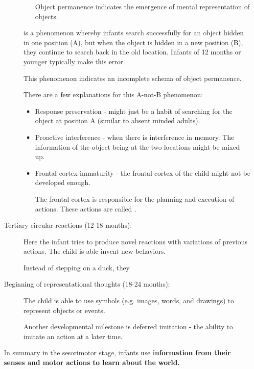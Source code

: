 \documentclass[../main/main.tex]{subfiles}
\begin{document}
\begin{description}
\begin{itemize}
                Object permanence indicates the emergence of mental representation of objects.
        \end{itemize}
 is a phenomenon whereby infants search successfully for an object hidden in one position (A), but when the object is hidden in a new position (B), they continue to search back in the old location. Infants of 12 months or younger typically make this error.
            \begin{remark} This phenomenon indicates an incomplete schema of object permanence.
                \end{remark}
                There are a few explanations for this A-not-B phenomenon:
                \begin{itemize}
                  \item Response preservation - might just be a habit of searching for the object at position A (similar to absent minded adults).
                  \item Proactive interference - when there is interference in memory. The information of the object being at the two locations might be mixed up.
                  \item Frontal cortex immaturity - the frontal cortex of the child might not be developed enough.
                        \begin{remark}
The frontal cortex is responsible for the planning and execution of actions. These actions are called .
                        \end{remark}
                \end{itemize}
  \item[Tertiary circular reactions (12-18 months):] Here the infant tries to produce novel reactions with variations of previous actions. The child is able invent new behaviors.
        \begin{example}
Instead of stepping on a duck, they
        \end{example}
  \item[Beginning of representational thoughts (18-24 months):] The child is able to use symbols (e.g. images, words, and drawings) to represent objects or events.
\begin{remark}
  Another developmental milestone is deferred imitation - the ability to imitate an action at a later time.
\end{remark}
\end{description}
In summary in the sesorimotor stage, infants use \textbf{information from their senses and motor actions to learn about the world.}\\
\end{document}
